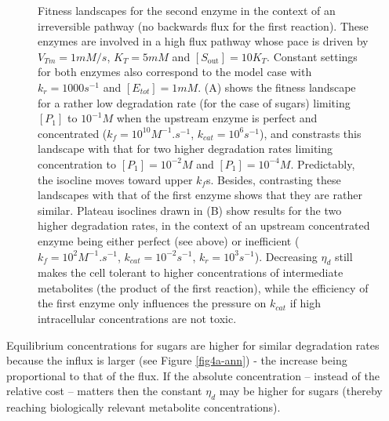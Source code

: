\begin{figure}[h!]
\begin{center}
\begin{minipage}[c]{0.47\linewidth}
\end{minipage}
\caption{Fitness landscapes for the second enzyme in the context of an irreversible pathway (no backwards flux for the first reaction). These enzymes are involved in a high flux pathway whose pace is driven by $\displaystyle V_{Tm}=1 mM/s$, $\displaystyle K_T=5mM$ and $\displaystyle [S_\text{out}]=10K_T$. Constant settings for both enzymes also correspond to the model case with $k_r=1000s^{-1}$ and $ [E_{tot}]=1mM$. (A) shows the fitness landscape for a rather low degradation rate (for the case of sugars) limiting $[P_1]$ to $10^{-1}M$ when the upstream enzyme is perfect and concentrated ($k_f=10^{10}M^{-1}.s^{-1}$, $k_{cat}=10^6s^{-1}$), and constrasts this landscape with that for two higher degradation rates limiting concentration to $[P_{1}]=10^{-2}M$ and $[P_{1}]=10^{-4}M$. Predictably, the isocline moves toward upper $k_f$s. Besides, contrasting these landscapes with that of the first enzyme shows that they are rather similar. Plateau isoclines drawn in (B) show results for the two higher degradation rates, in the context of an upstream concentrated enzyme being either perfect (see above) or inefficient ($k_f=10^{2}M^{-1}.s^{-1}$, $k_{cat}=10^{-2}s^{-1}$, $k_r=10^3s^{-1}$). Decreasing $\eta_d$ still makes the cell tolerant to higher concentrations of intermediate metabolites (the product of the first reaction), while the efficiency of the first enzyme only influences the pressure on $k_{cat}$ if high intracellular concentrations are not toxic.}
\label{fig4-ann}
\end{center}
\end{figure}

Equilibrium concentrations for sugars are higher for similar degradation rates because the influx is larger (see Figure \ref{fig4a-ann}) - the increase being proportional to that of the flux. If the absolute concentration -- instead of the relative cost -- matters then the constant $\eta_d$ may be higher for sugars (thereby reaching biologically relevant metabolite concentrations). %




